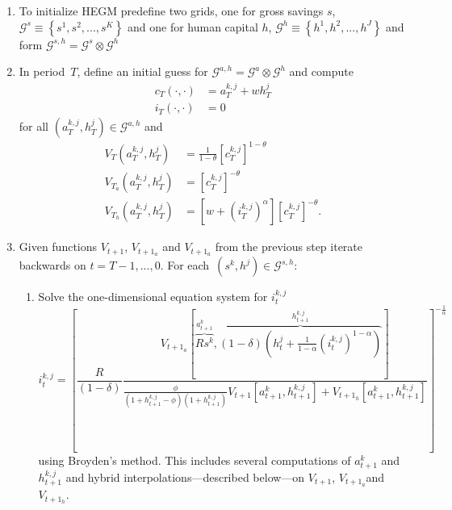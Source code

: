 \documentclass[a4paper,12pt]{article}
\begin{document}
\begin{enumerate}
	\item To initialize HEGM predefine two grids, one for gross savings $s$, $\mathcal{G}^{s}\equiv\left\{  s^{1},s^{2},...,s^{K}\right\}  $ and one for human capital $h$, $\mathcal{G}^{h}\equiv\left\{ h^{1},h^{2},...,h^{J}\right\}$ and form $\mathcal{G}^{s,h}=\mathcal{G}^{s}\otimes\mathcal{G}^{h}$

	\item In period~$T$, define an initial guess for $\mathcal{G}^{a,h}=\mathcal{G}^{a}\otimes\mathcal{G}^{h}$ and compute
	\begin{align*}
		c_{T}\left(\cdot,\cdot\right)  &  = a_{T}^{k,j}+wh_{T}^{j}  \\
		i_{T}\left(\cdot,\cdot\right)  &  = 0
	\end{align*}
	for all $\left(a_{T}^{k,j},h_{T}^{j}\right) \in \mathcal{G}^{a,h}$ and
	\begin{align*}
	V_{T}\left(a_{T}^{k,j},h_{T}^{j}\right)  &  = \frac{1} {1 - \theta}\left[c_{T}^{k,j}\right]^{1-\theta}  \\
	\text{$V_{T_{a}}$}\left(a_{T}^{k,j},h_{T}^{j}\right)  &  = \left[c_{T}^{k,j}\right]^{-\theta}  \\
	\text{$V_{T_{h}}$}\left(a_{T}^{k,j},h_{T}^{j}\right)  &  = \left[w + \left(i_{T}^{k,j}\right)^{\alpha}\right] \left[c_{T}^{k,j}\right]^{-\theta}.
	\end{align*}

	\item Given functions $V_{t+1}$, $V_{t+1_{a}}$ and $V_{t+1_{a}}$ from the previous step iterate backwards on $t=T-1,...,0$. For each\ $\left(s^{k},h^{j}\right)  \in\mathcal{G}^{s,h}$:

	\begin{enumerate}
		\item \label{HEGM solver}Solve the one-dimensional equation system for $i_{t}^{k,j}$
		\[
			i_{t}^{k,j} = \left[\frac{R} {\left(1 - \delta\right)} \frac{\text{$V_{t+1_{a}}$} \left[\overset{a_{t+1}^{k}}{\overbrace{Rs^{k}}},\overset{h_{t+1}^{k,j}}{\overbrace{\left( 1-\delta\right) \left(h_{t}^{j} + \frac{1} {1 - \alpha}\left(i_{t}^{k,j}\right)^{1-\alpha}\right)}}\right]}{\frac{\phi} {\left(1 + h_{t+1}^{k,j} - \phi\right) \left(1 + h_{t+1}^{k,j}\right)} V_{t+1}\left[a_{t+1}^{k},h_{t+1}^{k,j}\right] + \text{$V_{t+1_{h}}$}\left[a_{t+1}^{k},h_{t+1}^{k,j}\right] }\right]^{-\frac{1}{\alpha}}
		\]
		using Broyden's method. This includes several computations of $a_{t+1}^{k}$ and $h_{t+1}^{k,j}$ and hybrid interpolations---described below---on $V_{t+1}$, $V_{t+1_{a}}$and $V_{t+1_{h}}$.


\end{enumerate}
\end{enumerate}
\end{document}
